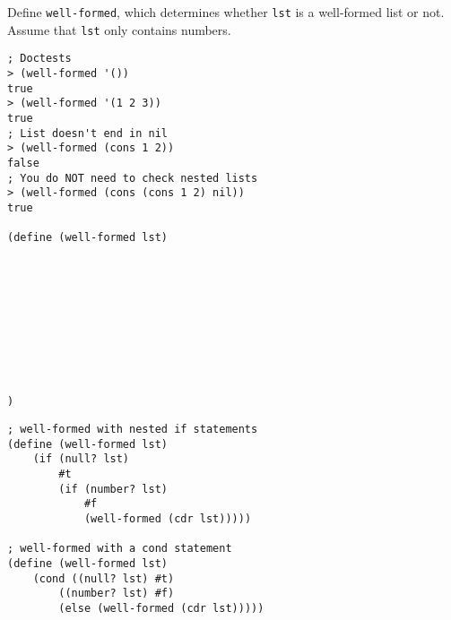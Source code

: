 \begin{blocksection}
\question Define \lstinline$well-formed$, which determines whether \lstinline$lst$ is a well-formed list or not. Assume that \lstinline$lst$ only contains numbers.

\begin{lstlisting}
; Doctests
> (well-formed '())
true
> (well-formed '(1 2 3))
true
; List doesn't end in nil
> (well-formed (cons 1 2))
false
; You do NOT need to check nested lists
> (well-formed (cons (cons 1 2) nil))
true

(define (well-formed lst)
    









)
\end{lstlisting}

\newpage
\begin{solution}[1.5in]
\begin{lstlisting}
; well-formed with nested if statements
(define (well-formed lst)
    (if (null? lst)
        #t
        (if (number? lst)
            #f
            (well-formed (cdr lst)))))

; well-formed with a cond statement
(define (well-formed lst)
    (cond ((null? lst) #t)
        ((number? lst) #f)
        (else (well-formed (cdr lst)))))
\end{lstlisting}
\end{solution}
\end{blocksection}
